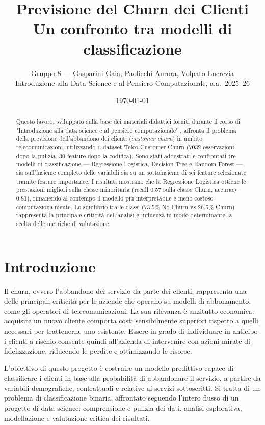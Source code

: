 \documentclass[11pt]{article}
\title{\textbf{Previsione del Churn dei Clienti}\\
\large Un confronto tra modelli di classificazione}
\author{Gruppo 8 --- Gasparini Gaia, Paolicchi Aurora, Volpato Lucrezia\\
\small Introduzione alla Data Science e al Pensiero Computazionale, a.a.\ 2025--26}
\date{\today}
\begin{document}
\maketitle

\begin{abstract}
Questo lavoro, sviluppato sulla base dei materiali didattici forniti durante il corso di "Introduzione alla data science e al pensiero computazionale" \cite{PoggiIntroDS2026}, affronta il problema della previsione dell'abbandono dei clienti (\emph{customer churn}) in ambito telecomunicazioni, utilizzando il dataset Telco Customer Churn (7032 osservazioni dopo la pulizia, 30 feature dopo la codifica). Sono stati addestrati e confrontati tre modelli di classificazione --- Regressione Logistica, Decision Tree e Random Forest --- sia sull'insieme completo delle variabili sia su un sottoinsieme di sei feature selezionate tramite feature importance. I risultati mostrano che la Regressione Logistica ottiene le prestazioni migliori sulla classe minoritaria (recall 0.57 sulla classe Churn, accuracy 0.81), rimanendo al contempo il modello più interpretabile e meno costoso computazionalmente. Lo squilibrio tra le classi (73.5\% No Churn vs 26.5\% Churn) rappresenta la principale criticità dell'analisi e influenza in modo determinante la scelta delle metriche di valutazione.
\end{abstract}

\section{Introduzione}
\label{sec:introduzione}

Il churn, ovvero l'abbandono del servizio da parte dei clienti, rappresenta una delle principali criticità per le aziende che operano su modelli di abbonamento, come gli operatori di telecomunicazioni. La sua rilevanza è anzitutto economica: acquisire un nuovo cliente comporta costi sensibilmente superiori rispetto a quelli necessari per trattenerne uno esistente. Essere in grado di individuare in anticipo i clienti a rischio consente quindi all'azienda di intervenire con azioni mirate di fidelizzazione, riducendo le perdite e ottimizzando le risorse.

L'obiettivo di questo progetto è costruire un modello predittivo capace di classificare i clienti in base alla probabilità di abbandonare il servizio, a partire da variabili demografiche, contrattuali e relative ai servizi sottoscritti. Si tratta di un problema di classificazione binaria, affrontato seguendo l'intero flusso di un progetto di data science: comprensione e pulizia dei dati, analisi esplorativa, modellazione e valutazione critica dei risultati.
\end{document}
